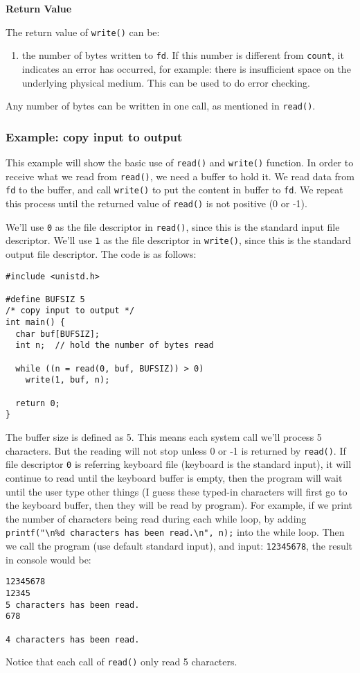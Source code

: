 \documentclass[11pt]{article}
\begin{document}
\textbf{Return Value}

The return value of \texttt{write()} can be:
\begin{enumerate}
\item the number of bytes written to \texttt{fd}. If this number is different from \texttt{count}, it indicates an error has occurred, for example: there is insufficient space on the underlying physical medium. This can be used to do error checking.
\end{enumerate}

Any number of bytes can be written in one call, as mentioned in \texttt{read()}.
\subsubsection{Example: copy input to output}
\label{sec:orgdafc274}
This example will show the basic use of \texttt{read()} and \texttt{write()} function. In order to receive what we read from \texttt{read()}, we need a buffer to hold it. We read data from \texttt{fd} to the buffer, and call \texttt{write()} to put the content in buffer to \texttt{fd}. We repeat this process until the returned value of \texttt{read()} is not positive (0 or -1).

We'll use \texttt{0} as the file descriptor in \texttt{read()}, since this is the standard input file descriptor. We'll use \texttt{1} as the file descriptor in \texttt{write()}, since this is the standard output file descriptor. The code is as follows:
\begin{verbatim}
#include <unistd.h>

#define BUFSIZ 5
/* copy input to output */
int main() {
  char buf[BUFSIZ];
  int n;  // hold the number of bytes read

  while ((n = read(0, buf, BUFSIZ)) > 0)
    write(1, buf, n);

  return 0;
}
\end{verbatim}
The buffer size is defined as 5. This means each system call we'll process 5 characters. But the reading will not stop unless 0 or -1 is returned by \texttt{read()}. If file descriptor \texttt{0} is referring keyboard file (keyboard is the standard input), it will continue to read until the keyboard buffer is empty, then the program will wait until the user type other things (I guess these typed-in characters will first go to the keyboard buffer, then they will be read by program). For example, if we print the number of characters being read during each while loop, by adding \texttt{printf("\textbackslash{}n\%d characters has been read.\textbackslash{}n", n);} into the while loop. Then we call the program (use default standard input), and input: \texttt{12345678}, the result in console would be:
\begin{Verbatim}[frame=single]
12345678
12345
5 characters has been read.
678

4 characters has been read.
\end{Verbatim}
Notice that each call of \texttt{read()} only read 5 characters.
\end{document}
